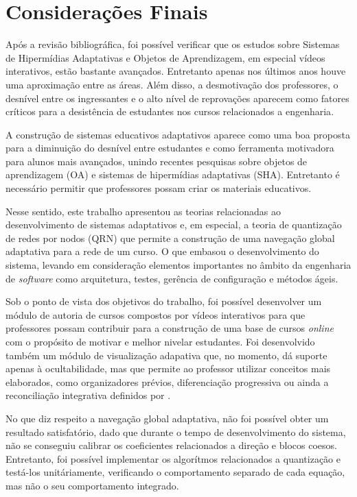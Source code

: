 \chapter[Considerações Finais]{Considerações Finais}

Após a revisão bibliográfica, foi possível verificar que os estudos sobre Sistemas de Hipermídias Adaptativas e Objetos de Aprendizagem, em especial vídeos interativos, estão bastante avançados. Entretanto apenas nos últimos anos houve uma aproximação entre as áreas. Além disso, a desmotivação dos professores, o desnível entre os ingressantes e o alto nível de reprovações aparecem como fatores críticos para a desistência de estudantes nos cursos relacionados a engenharia\cite{silva2005}. 

A construção de sistemas educativos adaptativos aparece como uma boa proposta para a diminuição do desnível entre estudantes e como ferramenta motivadora para alunos mais avançados, unindo recentes pesquisas sobre objetos de aprendizagem (OA) e sistemas de hipermídias adaptativas (SHA). Entretanto é necessário permitir que professores possam criar os materiais educativos.

Nesse sentido, este trabalho apresentou as teorias relacionadas ao desenvolvimento de sistemas adaptativos e, em especial, a teoria de quantização de redes por nodos (QRN) que permite a construção de uma navegação global adaptativa para a rede de um curso. O que embasou o desenvolvimento do sistema, levando em consideração elementos importantes no âmbito da engenharia de \textit{software} como arquitetura, testes, gerência de configuração e métodos ágeis. 

Sob o ponto de vista dos objetivos do trabalho, foi possível desenvolver um módulo de autoria de cursos compostos por vídeos interativos para que professores possam contribuir para a construção de uma base de cursos \textit{online} com o propósito de motivar e melhor nivelar estudantes. Foi desenvolvido também um módulo de visualização adapativa que, no momento, dá suporte apenas à ocultabilidade, mas que permite ao professor utilizar conceitos mais elaborados, como organizadores prévios, diferenciação progressiva ou ainda a reconciliação integrativa definidos por .

No que diz respeito a navegação global adaptativa, não foi possível obter um resultado satisfatório, dado que durante o tempo de desenvolvimento do sistema, não se conseguiu calibrar os coeficientes relacionados a direção e blocos coesos. Entretanto, foi possível implementar os algorítmos relacionados a quantização e testá-los unitáriamente, verificando o comportamento separado de cada equação, mas não o seu comportamento integrado. 

